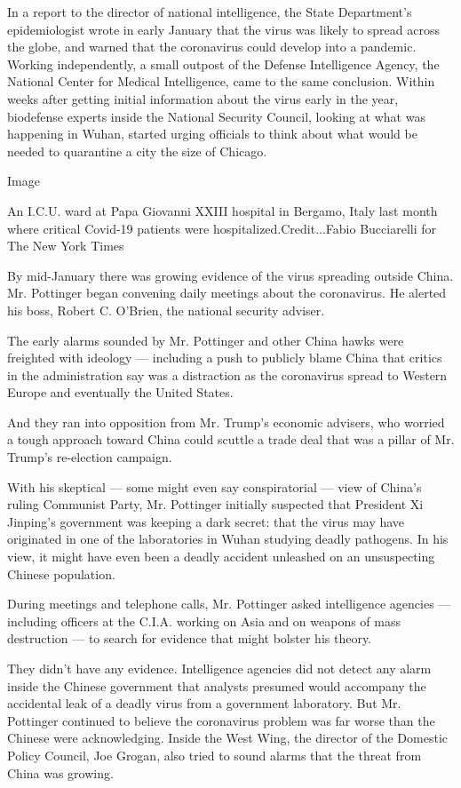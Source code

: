 In a report to the director of national intelligence, the State
Department's epidemiologist wrote in early January that the virus was
likely to spread across the globe, and warned that the coronavirus could
develop into a pandemic. Working independently, a small outpost of the
Defense Intelligence Agency, the National Center for Medical
Intelligence, came to the same conclusion. Within weeks after getting
initial information about the virus early in the year, biodefense
experts inside the National Security Council, looking at what was
happening in Wuhan, started urging officials to think about what would
be needed to quarantine a city the size of Chicago.

Image

An I.C.U. ward at Papa Giovanni XXIII hospital in Bergamo, Italy last
month where critical Covid-19 patients were hospitalized.Credit...Fabio
Bucciarelli for The New York Times

By mid-January there was growing evidence of the virus spreading outside
China. Mr. Pottinger began convening daily meetings about the
coronavirus. He alerted his boss, Robert C. O'Brien, the national
security adviser.

The early alarms sounded by Mr. Pottinger and other China hawks were
freighted with ideology --- including a push to publicly blame China
that critics in the administration say was a distraction as the
coronavirus spread to Western Europe and eventually the United States.

And they ran into opposition from Mr. Trump's economic advisers, who
worried a tough approach toward China could scuttle a trade deal that
was a pillar of Mr. Trump's re-election campaign.

With his skeptical --- some might even say conspiratorial --- view of
China's ruling Communist Party, Mr. Pottinger initially suspected that
President Xi Jinping's government was keeping a dark secret: that the
virus may have originated in one of the laboratories in Wuhan studying
deadly pathogens. In his view, it might have even been a deadly accident
unleashed on an unsuspecting Chinese population.

During meetings and telephone calls, Mr. Pottinger asked intelligence
agencies --- including officers at the C.I.A. working on Asia and on
weapons of mass destruction --- to search for evidence that might
bolster his theory.

They didn't have any evidence. Intelligence agencies did not detect any
alarm inside the Chinese government that analysts presumed would
accompany the accidental leak of a deadly virus from a government
laboratory. But Mr. Pottinger continued to believe the coronavirus
problem was far worse than the Chinese were acknowledging. Inside the
West Wing, the director of the Domestic Policy Council, Joe Grogan, also
tried to sound alarms that the threat from China was growing.

